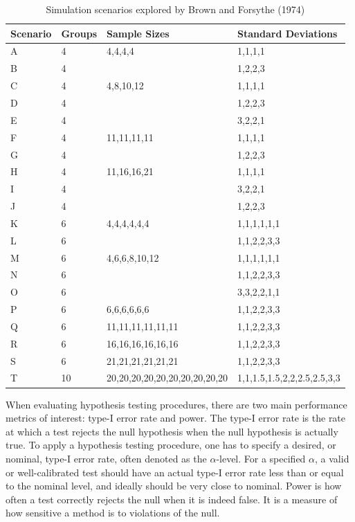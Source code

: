 \documentclass[
]{book}
\begin{document}
\begin{table}
\centering
\caption{\label{tab:BF-Scenarios}Simulation scenarios explored by Brown and Forsythe (1974)}
\centering
\begin{tabular}[t]{l|l|l|l}
\hline
Scenario & Groups & Sample Sizes & Standard Deviations\\
\hline
A & 4 & 4,4,4,4 & 1,1,1,1\\
\hline
B & 4 &  & 1,2,2,3\\
\hline
C & 4 & 4,8,10,12 & 1,1,1,1\\
\hline
D & 4 &  & 1,2,2,3\\
\hline
E & 4 &  & 3,2,2,1\\
\hline
F & 4 & 11,11,11,11 & 1,1,1,1\\
\hline
G & 4 &  & 1,2,2,3\\
\hline
H & 4 & 11,16,16,21 & 1,1,1,1\\
\hline
I & 4 &  & 3,2,2,1\\
\hline
J & 4 &  & 1,2,2,3\\
\hline
K & 6 & 4,4,4,4,4,4 & 1,1,1,1,1,1\\
\hline
L & 6 &  & 1,1,2,2,3,3\\
\hline
M & 6 & 4,6,6,8,10,12 & 1,1,1,1,1,1\\
\hline
N & 6 &  & 1,1,2,2,3,3\\
\hline
O & 6 &  & 3,3,2,2,1,1\\
\hline
P & 6 & 6,6,6,6,6,6 & 1,1,2,2,3,3\\
\hline
Q & 6 & 11,11,11,11,11,11 & 1,1,2,2,3,3\\
\hline
R & 6 & 16,16,16,16,16,16 & 1,1,2,2,3,3\\
\hline
S & 6 & 21,21,21,21,21,21 & 1,1,2,2,3,3\\
\hline
T & 10 & 20,20,20,20,20,20,20,20,20,20 & 1,1,1.5,1.5,2,2,2.5,2.5,3,3\\
\hline
\end{tabular}
\end{table}

When evaluating hypothesis testing procedures, there are two main performance metrics of interest: type-I error rate and power.
The type-I error rate is the rate at which a test rejects the null hypothesis when the null hypothesis is actually true.
To apply a hypothesis testing procedure, one has to specify a desired, or nominal, type-I error rate, often denoted as the \(\alpha\)-level.
For a specified \(\alpha\), a valid or well-calibrated test should have an actual type-I error rate less than or equal to the nominal level, and ideally should be very close to nominal.
Power is how often a test correctly rejects the null when it is indeed false.
It is a measure of how sensitive a method is to violations of the null.
\end{document}
